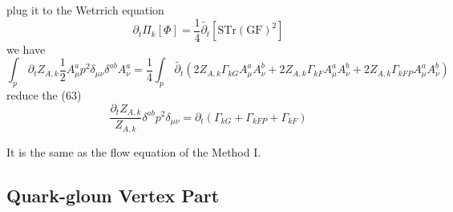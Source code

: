 \documentclass[UTF8]{ctexart}
\begin{document}
plug it to the Wetrrich equation
\begin{equation}
\partial_{t}\Pi_k [\Phi]=\frac{1}{4}\widetilde{\partial_{t}}[\mathrm{STr}{(\mathrm{GF})}^2]
\end{equation}
we have
\begin{equation}
\int_{p}\,\partial_{t}Z_{A,k}{\frac{1}{2}}A_{\mu}^{a}p^{2}\delta_{\mu\nu}\delta^{ab}A_{\nu}^{a}=\frac{1}{4}\int_{p}\,\widetilde{\partial_{t}}(2Z_{A,k}\Gamma_{kG}A_{\mu}^{a}A_{\nu}^{b}+2Z_{A,k}\Gamma_{kF}A_{\mu}^{a}A_{\nu}^{b}+2Z_{A,k}\Gamma_{kFP}A_{\mu}^{a}A_{\nu}^{b})
\end{equation}
reduce the (63)
\begin{equation}
\frac{\partial_{t}Z_{A,k}}{Z_{A,k}}\delta^{ab}p^{2}\delta_{\mu\nu}=\partial_{t}(\Gamma_{kG}+\Gamma_{kFP}+\Gamma_{kF})
\end{equation}
\par It is the same as the flow equation of the Method I.
\subsection{Quark-gloun Vertex Part}
\end{document}
